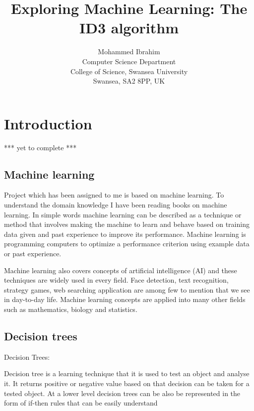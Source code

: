 \documentclass{article}
\begin{document}
\title{Exploring Machine Learning: The ID3 algorithm}

\author{Mohammed Ibrahim\\
 Computer Science Department\\
  College of Science, Swansea University\\
  Swansea, SA2 8PP, UK
}

\maketitle

\tableofcontents

\section{Introduction}
\label{sec:int}

*** yet to complete ***

\subsection{Machine learning}
\label{sec:machinelearn}

Project which has been assigned to me is based on machine learning. To understand the domain knowledge I have been reading books on machine learning. In simple words machine learning can be described as a technique or method that involves making the machine to learn and behave based on training data given and past experience to improve its performance. Machine learning is programming computers to optimize a performance criterion using example data or past experience.

Machine learning also covers concepts of artificial intelligence (AI) and these techniques are widely used in every field. Face detection, text recognition, strategy games, web searching application are among few to mention that we see in day-to-day life. Machine learning concepts are applied into many other fields such as mathematics, biology and statistics. 

\subsection{Decision trees}
\label{sec:dectree}

Decision Trees:

Decision tree is a learning technique that it is used to test an object and analyse it. It returns positive or negative value based on that decision can be taken for a tested object. At a lower level decision trees can be also be represented in the form of if-then rules that can be easily understand
\end{document}
